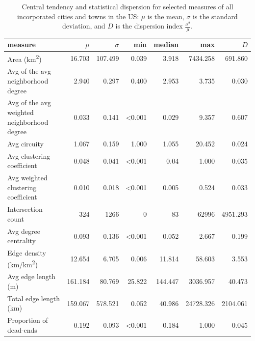 \documentclass[11pt]{article}
\begin{document}
\begin{multicols}{2}
\begin{table}
\centering
\caption{Central tendency and statistical dispersion for selected measures of all incorporated cities and towns in the US: $\mu$ is the mean, $\sigma$ is the standard deviation, and $D$ is the dispersion index $\frac{\sigma ^ 2}{\mu}$.}
\label{tab:measures_cities}
\small
\begin{tabular}{ l r r r r r r }
	\toprule
	measure                                          & $\mu$   & $\sigma$& min            & median         & max       & $D$      \\
	\midrule
	Area (km\textsuperscript{2})                     & 16.703  & 107.499 & 0.039          & 3.918          & 7434.258  & 691.860  \\
	Avg of the avg neighborhood degree               & 2.940   & 0.297   & 0.400          & 2.953          & 3.735     & 0.030    \\
	Avg of the avg weighted neighborhood degree      & 0.033   & 0.141   & \textless0.001 & 0.029          & 9.357     & 0.607    \\
	Avg circuity                                     & 1.067   & 0.159   & 1.000          & 1.055          & 20.452    & 0.024    \\
	Avg clustering coefficient                       & 0.048   & 0.041   & \textless0.001 & 0.04           & 1.000     & 0.035    \\
	Avg weighted clustering coefficient              & 0.010   & 0.018   & \textless0.001 & 0.005          & 0.524     & 0.033    \\
	Intersection count                               & 324     & 1266    & 0              & 83             & 62996     & 4951.293 \\
	Avg degree centrality                            & 0.093   & 0.136   & \textless0.001 & 0.052          & 2.667     & 0.199    \\
	Edge density (km/km\textsuperscript{2})          & 12.654  & 6.705   & 0.006          & 11.814         & 58.603    & 3.553    \\
	Avg edge length (m)                              & 161.184 & 80.769  & 25.822         & 144.447        & 3036.957  & 40.473   \\
	Total edge length (km)                           & 159.067 & 578.521 & 0.052          & 40.986         & 24728.326 & 2104.061 \\
	Proportion of dead-ends                          & 0.192   & 0.093   & \textless0.001 & 0.184          & 1.000     & 0.045    \\

\end{tabular}
\end{table}
\end{multicols}
\end{document}

